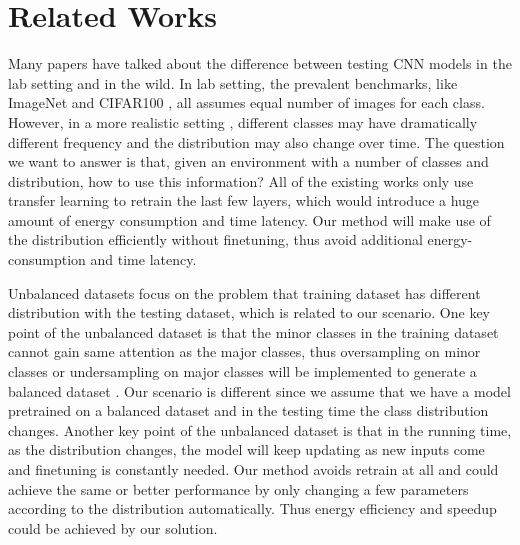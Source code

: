 \documentclass{article}
\begin{document}

\section{Related Works}
Many papers have talked about the difference between testing CNN models in the lab setting and in the wild. In lab setting, the prevalent benchmarks, like ImageNet \cite{deng2009imagenet} and CIFAR100 \cite{krizhevsky2009learning}, all assumes equal number of images for each class. However, in a more realistic setting \cite{han2016mcdnn, shen2017fast}, different classes may have dramatically different frequency and the distribution may also change over time. The question we want to answer is that, given an environment with a number of classes and distribution, how to use this information? All of the existing works \cite{han2016mcdnn, shen2017fast} only use transfer learning to retrain the last few layers, which would introduce a huge amount of energy consumption and time latency. Our method will make use of the distribution efficiently without finetuning, thus avoid additional energy-consumption and time latency.

Unbalanced datasets focus on the problem that training dataset has different distribution with the testing dataset, which is related to our scenario. One key point of the unbalanced dataset is that the minor classes in the training dataset cannot gain same attention as the major classes, thus oversampling on minor classes or undersampling on major classes will be implemented to generate a balanced dataset \cite{hoens2012learning, van2007experimental, wang2016dealing}. Our scenario is different since we assume that we have a model pretrained on a balanced dataset and in the testing time the class distribution changes. Another key point of the unbalanced dataset is that in the running time, as the distribution changes, the model will keep updating as new inputs come and finetuning is constantly needed. Our method avoids retrain at all and could achieve the same or better performance by only changing a few parameters according to the distribution automatically. Thus energy efficiency and speedup could be achieved by our solution.
\end{document}
